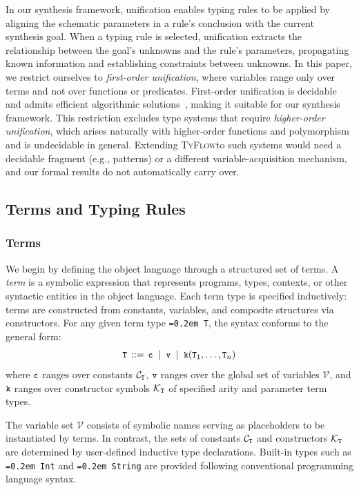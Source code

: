\documentclass[manuscript,screen]{acmart}
\newcommand{\toolname}[1]{\textsc{#1}}
\newcommand{\tcode}[1]{{\small \texttt{\spaceskip=0.2em #1}}}
\newcommand{\scode}[1]{{\fontsize{8.2pt}{\baselineskip}\tt \texttt{\spaceskip=0.15em #1}}}
\newcommand{\mainname}{\toolname{TyFlow}\xspace}
\begin{document}
In our synthesis framework, unification enables typing rules to be applied by aligning the schematic parameters in a rule's conclusion with the current synthesis goal. When a typing rule is selected, unification extracts the relationship between the goal's unknowns and the rule's parameters, propagating known information and establishing constraints between unknowns.
%
In this paper, we restrict ourselves to \emph{first-order unification}, where variables range only over terms and not over functions or predicates. 
First-order unification is decidable and admits efficient algorithmic solutions~\cite{DBLP:journals/jacm/Robinson65}, making it suitable for our synthesis framework.  {\color{revblue}This restriction excludes type systems that require }\emph{\color{revblue}higher-order unification}{\color{revblue}, which arises naturally with higher-order functions and polymorphism and is undecidable in general. Extending }\mainname {\color{revblue}to such systems would need a decidable fragment (e.g., patterns) or a different variable-acquisition mechanism, and our formal results do not automatically carry over.
} 

\subsection{Terms and Typing Rules}
\subsubsection{Terms}
\label{terms-intro}
We begin by defining the object language through a structured set of terms. A \emph{term} is a symbolic expression that represents programs, types, contexts, or other syntactic entities in the object language. Each term type is specified inductively: terms are constructed from constants, variables, and composite structures via constructors. For any given term type \tcode{T}, the syntax conforms to the general form:
\[\tcode{T} \,::=\, \tcode{c} \;\mid\; \tcode{v} \;\mid\; \tcode{k}(\tcode{T}_1, \ldots, \tcode{T}_n)\]
where \(\tcode{c}\) ranges over constants \(\mathcal{C}_\scode{T}\), \(\tcode{v}\) ranges over the global set of variables \(\mathcal{V}\), and \(\tcode{k}\) ranges over constructor symbols \(\mathcal{K}_\scode{T}\) of specified arity and parameter term types. 

The variable set $\mathcal{V}$ consists of symbolic names serving as placeholders to be instantiated by terms. In contrast, the sets of constants $\mathcal{C}_\scode{T}$ and constructors $\mathcal{K}_\scode{T}$ are determined by user-defined inductive type declarations. 
Built-in types such as \tcode{Int} and \tcode{String} are provided following conventional programming language syntax.
\end{document}
